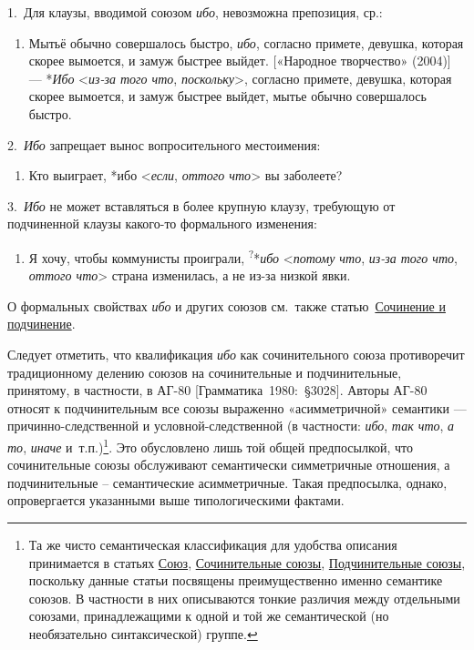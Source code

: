 1.~Для клаузы, вводимой союзом \textit{ибо}, невозможна препозиция, ср.:

\begin{enumerate}
\def\labelenumi{(\arabic{enumi})}
\setcounter{enumi}{176}
\item
  Мытьё обычно совершалось быстро, \textit{ибо}, согласно примете,
  девушка, которая скорее вымоется, и замуж быстрее выйдет. {[}«Народное
  творчество» (2004){]} --- *\textit{Ибо} \textless{}\textit{из-за того что},
  \textit{поскольку}\textgreater, согласно примете, девушка, которая
  скорее вымоется, и замуж быстрее выйдет, мытье обычно совершалось
  быстро.
\end{enumerate}

2.~\textit{Ибо} запрещает вынос вопросительного местоимения:

\begin{enumerate}
\def\labelenumi{(\arabic{enumi})}
\setcounter{enumi}{177}
\item
  Кто выиграет, *ибо \textless{}\textit{если}, \textit{оттого
  что}\textgreater{} вы заболеете?
\end{enumerate}

3.~\textit{Ибо} не может вставляться в более крупную клаузу, требующую от
подчиненной клаузы какого-то формального изменения:

\begin{enumerate}
\def\labelenumi{(\arabic{enumi})}
\setcounter{enumi}{178}
\item
  Я хочу, чтобы коммунисты проиграли, \textsuperscript{?}*\textit{ибо}
  \textless{}\textit{потому что}, \textit{из-за того что}, \textit{оттого
  что}\textgreater{} страна изменилась, а не из-за низкой явки.
\end{enumerate}

О формальных свойствах \textit{ибо} и других союзов см.~также
статью~\underline{Сочинение и подчинение}.

Следует отметить, что квалификация \textit{ибо} как сочинительного союза
противоречит традиционному делению союзов на сочинительные и
подчинительные, принятому, в частности, в АГ-80
{[}Грамматика~1980:~§3028{]}. Авторы АГ-80 относят к подчинительным все
союзы выраженно «асимметричной» семантики --- причинно-следственной и
условной-следственной (в частности: \textit{ибо}, \textit{так что}, \textit{а
то}, \textit{иначе} и~т.п.)\footnote{Та же чисто семантическая
  классификация для удобства описания принимается в статьях
  \underline{Союз}, \underline{Сочинительные союзы},
  \underline{Подчинительные союзы}, поскольку данные статьи посвящены
  преимущественно именно семантике союзов. В частности в них описываются
  тонкие различия между отдельными союзами, принадлежащими к одной и той
  же семантической (но необязательно синтаксической) группе.}. Это
обусловлено лишь той общей предпосылкой, что сочинительные союзы
обслуживают семантически симметричные отношения, а подчинительные --
семантические асимметричные. Такая предпосылка, однако, опровергается
указанными выше типологическими фактами.

